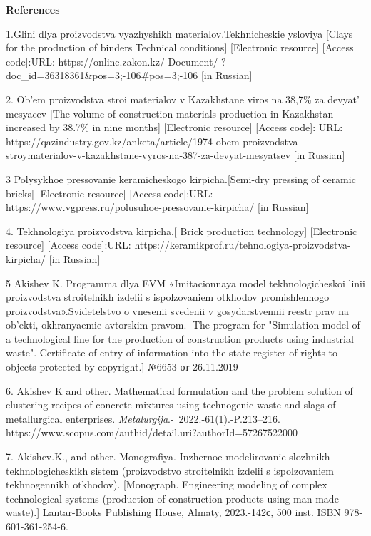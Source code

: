 {\bfseries References}

1.Glini dlya proizvodstva vyazhyshikh materialov.Tekhnicheskie ysloviya
{[}Clays for the production of binders Technical conditions{]}
{[}Electronic resource{]} {[}Access code{]}:URL:
https://online.zakon.kz/ Document/
?doc\_id=36318361\&pos=3;-106\#pos=3;-106 {[}in Russian{]}

2. Ob'em proizvodstva stroi materialov v Kazakhstane viros na 38,7\% za
devyat' mesyacev {[}The volume of construction materials production in
Kazakhstan increased by 38.7\% in nine months{]} {[}Electronic
resource{]} {[}Access code{]}: URL:~
https://qazindustry.gov.kz/anketa/article/1974-obem-proizvodstva-stroymaterialov-v-kazakhstane-vyros-na-387-za-devyat-mesyatsev
{[}in Russian{]}

3 Polysykhoe pressovanie keramicheskogo kirpicha.{[}Semi-dry pressing of
ceramic bricks{]} {[}Electronic resource{]} {[}Access code{]}:URL:
https://www.vgpress.ru/polusuhoe-pressovanie-kirpicha/ {[}in Russian{]}

4. Tekhnologiya proizvodstva kirpicha.{[} Brick production technology{]}
{[}Electronic resource{]} {[}Access code{]}:URL:
https://keramikprof.ru/tehnologiya-proizvodstva-kirpicha/ {[}in
Russian{]}

5 Akishev K. Programma dlya EVM «Imitacionnaya model tekhnologicheskoi
linii proizvodstva stroitelnikh izdelii s ispolzovaniem otkhodov
promishlennogo proizvodstva».Svidetelstvo o vnesenii svedenii v
gosydarstvennii reestr prav na ob'ekti, okhranyaemie avtorskim
pravom.{[} The program for "Simulation model of a technological line for
the production of construction products using industrial waste".
Certificate of entry of information into the state register of rights to
objects protected by copyright.{]} №6653 от 26.11.2019

6. Akishev K and other. Mathematical formulation and the problem
solution of clustering recipes of concrete mixtures using technogenic
waste and slags of metallurgical enterprises.
\emph{Metalurgija}.-~2022.-61(1).-P.213--216.
https://www.scopus.com/authid/detail.uri?authorId=57267522000

7. Akishev.K., and other. Monografiya. Inzhernoe modelirovanie slozhnikh
tekhnologicheskikh sistem (proizvodstvo stroitelnikh izdelii s
ispolzovaniem tekhnogennikh otkhodov). {[}Monograph. Engineering
modeling of complex technological systems (production of construction
products using man-made waste).{]} Lantar-Books Publishing House,
Almaty, 2023.-142с, 500 inst. ISBN 978-601-361-254-6.

